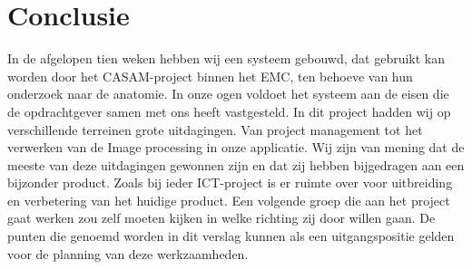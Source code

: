 \section{Conclusie}
\label{Conclusie}
In de afgelopen tien weken hebben wij een systeem gebouwd, dat gebruikt kan worden door het CASAM-project binnen het EMC, ten behoeve van hun onderzoek naar de anatomie.
In onze ogen voldoet het systeem aan de eisen die de opdrachtgever samen met ons heeft vastgesteld. 
In dit project hadden wij op verschillende terreinen grote uitdagingen.
Van project management tot het verwerken van de Image processing in onze applicatie.
Wij zijn van mening dat de meeste van deze uitdagingen gewonnen zijn en dat zij hebben bijgedragen aan een bijzonder product. 
Zoals bij ieder ICT-project is er ruimte over voor uitbreiding en verbetering van het huidige product.
Een volgende groep die aan het project gaat werken zou zelf moeten kijken in welke richting zij door willen gaan.
De punten die genoemd worden in dit verslag kunnen als een uitgangspositie gelden voor de planning van deze werkzaamheden.